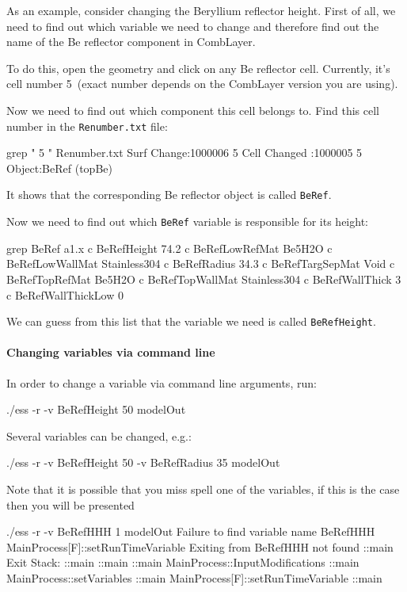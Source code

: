 As an example, consider changing the Beryllium reflector height.
First of all, we need to find out which variable we need to change and therefore find out the name of the Be reflector
component in CombLayer.

To do this, open the \mcnp geometry and click on any Be reflector cell. Currently, it's cell number 5~(exact number depends on the
CombLayer version you are using).

Now we need to find out which component this cell belongs to.  Find this cell number in the {\tt Renumber.txt} file:
\begin{bash}
grep " 5 " Renumber.txt 
Surf Change:1000006 5                                                           
Cell Changed :1000005 5 Object:BeRef (topBe)       
\end{bash}
It shows that the corresponding Be reflector object is called {\tt BeRef}.

Now we need to find out which {\tt BeRef} variable is responsible for its height:
\begin{bash}
grep BeRef a1.x 
c BeRefHeight 74.2
c BeRefLowRefMat Be5H2O
c BeRefLowWallMat Stainless304
c BeRefRadius 34.3
c BeRefTargSepMat Void
c BeRefTopRefMat Be5H2O
c BeRefTopWallMat Stainless304
c BeRefWallThick 3
c BeRefWallThickLow 0
\end{bash}

We can guess from this list that the variable we need is called {\tt BeRefHeight}.

\paragraph[Command line]{Changing variables via command line}
In order to change a variable via command line arguments, run:
\begin{bash}
  ./ess -r -v BeRefHeight 50 modelOut
\end{bash}
Several variables can be changed, e.g.:
\begin{bash}
  ./ess -r -v BeRefHeight 50 -v BeRefRadius 35 modelOut
\end{bash}

Note that it is possible that you miss spell one of the variables, if this is the case then
you will be presented 

\begin{bash}
./ess -r -v BeRefHHH 1 modelOut
Failure to find variable name BeRefHHH                     MainProcess[F]::setRunTimeVariable
Exiting from BeRefHHH not found                            ::main
Exit Stack:                                                ::main
::main                                                     ::main
  MainProcess::InputModifications                          ::main
    MainProcess::setVariables                              ::main
      MainProcess[F]::setRunTimeVariable                   ::main
\end{bash}

